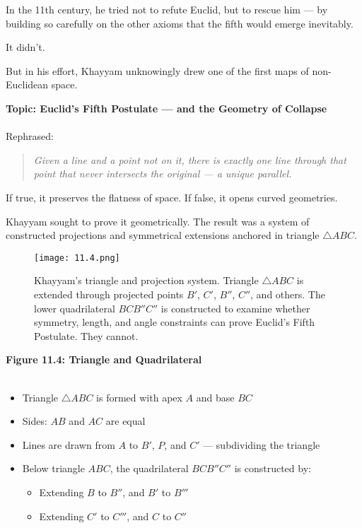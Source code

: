 \documentclass[9pt]{article}
\begin{document}
In the 11th century, he tried not to refute Euclid, but to rescue him — by building so carefully on the other axioms that the fifth would emerge inevitably.

It didn’t.

But in his effort, Khayyam unknowingly drew one of the first maps of non-Euclidean space.

\vspace{1em}

\textbf{Topic: Euclid’s Fifth Postulate — and the Geometry of Collapse} \\\\
Rephrased:

\begin{quote}
\itshape
Given a line and a point not on it, there is exactly one line through that point that never intersects the original — a unique parallel.
\end{quote}

If true, it preserves the flatness of space. If false, it opens curved geometries.

Khayyam sought to prove it geometrically. The result was a system of constructed projections and symmetrical extensions anchored in triangle $\triangle ABC$.

\vspace{1em}

\begin{figure}[H]
  \centering
  \texttt{[image: 11.4.png]}
  \caption{Khayyam's triangle and projection system. Triangle $\triangle ABC$ is extended through projected points $B'$, $C'$, $B''$, $C''$, and others. The lower quadrilateral $BCB''C''$ is constructed to examine whether symmetry, length, and angle constraints can prove Euclid’s Fifth Postulate. They cannot.}
\end{figure}

\vspace{1em}

\textbf{Figure 11.4: Triangle  and Quadrilateral } \\\\
\begin{itemize}
    \item Triangle $\triangle ABC$ is formed with apex $A$ and base $BC$
    \item Sides: $AB$ and $AC$ are equal
    \item Lines are drawn from $A$ to $B'$, $P$, and $C'$ — subdividing the triangle
    \item Below triangle $ABC$, the quadrilateral $BCB''C''$ is constructed by:
    \begin{itemize}
        \item Extending $B$ to $B''$, and $B'$ to $B'''$
        \item Extending $C'$ to $C'''$, and $C$ to $C''$
    \end{itemize}
\end{itemize}
\end{document}
